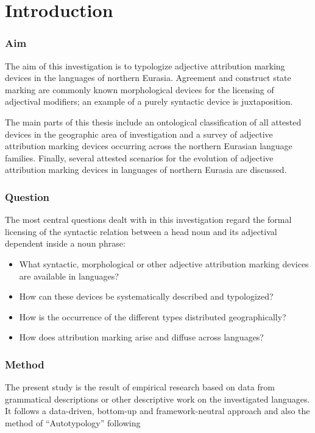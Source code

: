 
\chapter{Introduction}

\subsection*{Aim}
The aim of this investigation is to typologize adjective attribution marking devices in the languages of northern Eurasia. Agreement and construct state marking are commonly known morphological devices for the licensing of adjectival modifiers; an example of a purely syntactic device is juxtaposition.  

The main parts of this thesis include an ontological classification of all attested devices in the geographic area of investigation and a survey of adjective attribution marking devices occurring across the northern Eurasian language families. Finally, several attested scenarios for the evolution of adjective attribution marking devices in languages of northern Eurasia are discussed.

\subsection*{Question}

The most central questions dealt with in this investigation regard the formal licensing of the syntactic relation between a head noun and its adjectival dependent inside a noun phrase:
\begin{itemize}
\item What syntactic, morphological or other adjective attribution marking devices are available in languages? 
\item How can these devices be systematically described and typologized? 
\item How is the occurrence of the different types distributed geographically? 
\item How does attribution marking arise and diffuse across languages?
\end{itemize}

\subsection*{Method}

The present study is the result of empirical research based on data from grammatical descriptions or other descriptive work on the investigated languages. It follows a data-driven, bottom-up and framework-neutral approach \citep[cf.][]{haspelmath2010} and also the method of “Autotypology” following \citet{bickel-etal2002,bickel2007}

